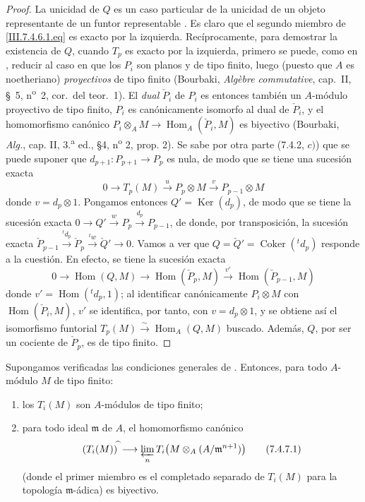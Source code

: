 \begin{proof}
La unicidad de $Q$ es un caso particular de la unicidad de un objeto
representante de un funtor representable . Es claro que el
segundo miembro de \eqref{III.7.4.6.1.eq} es exacto por la izquierda.
Recíprocamente, para demostrar la existencia de $Q$, cuando $T_p$ es exacto
por la izquierda, primero se puede, como en , reducir al caso
en que los $P_i$ son planos y de tipo finito, luego (puesto que $A$ es
noetheriano) \emph{proyectivos} de tipo finito (Bourbaki,
\emph{Algèbre commutative}, cap.~II, \S~5, n\textsuperscript{o}~2, cor.~del
teor.~1). El \emph{dual} $\check P_i$ de $P_i$ es entonces también un $A$-módulo
proyectivo de tipo finito, $P_i$ es canónicamente isomorfo al dual de
$\check P_i$, y el homomorfismo canónico
$P_i\otimes_A M\longrightarrow\operatorname{Hom}_A(\check P_i,M)$
es biyectivo (Bourbaki, \emph{Alg.}, cap. II, 3.\textsuperscript{a} ed.,
\S 4, n\textsuperscript{o} 2, prop. 2). Se sabe por otra parte (7.4.2, $c)$)
que se puede suponer que $d_{p+1}:P_{p+1}\to P_p$ es nula, de modo que se tiene una sucesión exacta
\[
  0\longrightarrow T_p(M)\xrightarrow{u}P_p\otimes M
  \xrightarrow{v}P_{p-1}\otimes M
\]
donde $v=d_p\otimes1$. Pongamos entonces $Q'=\operatorname{Ker}(d_p)$, de modo que se tiene
la sucesión exacta
$0\longrightarrow Q'\xrightarrow{w}P_p\xrightarrow{d_p}P_{p-1}$,
de donde, por transposición, la sucesión exacta
$\check P_{p-1}\xrightarrow{{}^t d_p}\check P_p
\xrightarrow{{}^t w}\check Q'\longrightarrow0$.
Vamos a ver que
$Q=\check Q'=\operatorname{Coker}({}^t d_p)$
responde a la cuestión. En efecto, se tiene la sucesión exacta
\[
  0\longrightarrow\operatorname{Hom}(Q,M)
  \longrightarrow\operatorname{Hom}(\check P_p,M)
  \xrightarrow{v'}\operatorname{Hom}(\check P_{p-1},M)
\]
donde $v'=\operatorname{Hom}({}^t d_p,1)$; al identificar canónicamente
$P_i\otimes M$ con $\operatorname{Hom}(\check P_i,M)$, $v'$ se identifica, por tanto, con
$v=d_p\otimes1$, y se obtiene así el isomorfismo funtorial
$T_p(M)\xrightarrow{\sim}\operatorname{Hom}_A(Q,M)$
buscado. Además, $Q$, por ser un cociente de $\check P_p$, es de tipo finito.
\end{proof}

\begin{proposition}[7.4.7]
\label{III.7.4.7}
Supongamos verificadas las condiciones generales de . Entonces,
para todo $A$-módulo $M$ de tipo finito:
\begin{enumerate}
  \item[\textup{(i)}] los $T_i(M)$ son $A$-módulos de tipo finito;
  \item[\textup{(ii)}] para todo ideal $\mathfrak m$ de $A$, el homomorfismo canónico
    \[
      (T_i(M))^{\widehat{\,}}
      \longrightarrow
      \varprojlim_n T_i\bigl(M\otimes_A(A/\mathfrak m^{n+1})\bigr)
      \tag{7.4.7.1}\label{III.7.4.7.1.fr}
    \]
    (donde el primer miembro es el completado separado de $T_i(M)$ para la
    topología $\mathfrak m$-ádica) es biyectivo.
\end{enumerate}
\end{proposition}

